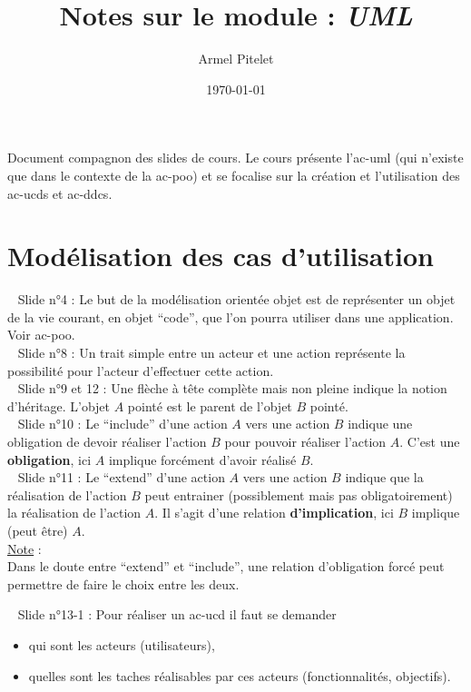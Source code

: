 \documentclass[a4paper,12pt,twoside]{article}
\title{Notes sur le module : \textit{UML}}
\author{Armel Pitelet}
\date{\today}
\newcommand{\note}[1]{\noindent\underline{Note} : \\ \indent #1}
\newcommand{\slide}[2]{\textbullet ~ Slide n°#1 : \indent #2}
\begin{document}
\maketitle
\author{}
\date{}
\tableofcontents%
\newpage

Document compagnon des slides de cours. Le cours présente l'\gls{ac-uml} (qui n'existe que dans le contexte de la \gls{ac-poo}) et se focalise sur la création et l'utilisation des \glspl{ac-ucd} et \glspl{ac-ddc}.   

\section{Modélisation des cas d'utilisation}

\slide{4}{Le but de la modélisation orientée objet est de représenter un objet de la vie courant, en objet ``code'', que l'on pourra utiliser dans une application. Voir \gls{ac-poo}.}\\

\slide{8}{Un trait simple entre un acteur et une action représente la possibilité pour l'acteur d'effectuer cette action.} \\

\slide{9 et 12}{Une flèche à tête complète mais non pleine indique la notion d'héritage. L'objet $A$ pointé est le parent de l'objet $B$ pointé.} \\

\slide{10}{Le ``include'' d'une action $A$ vers une action $B$ indique une obligation de devoir réaliser l'action $B$ pour pouvoir réaliser l'action $A$. C'est une \textbf{obligation}, ici $A$ implique forcément d'avoir réalisé $B$.} \\

\slide{11}{Le ``extend'' d'une action $A$ vers une action $B$ indique que la réalisation de l'action $B$ peut entrainer (possiblement mais pas obligatoirement) la réalisation de l'action $A$. Il s'agit d'une relation \textbf{d'implication}, ici $B$ implique (peut être) $A$.} \\

\note{Dans le doute entre ``extend'' et ``include'', une relation d'obligation forcé peut permettre de faire le choix entre les deux.}

\slide{13-1}{Pour réaliser un \gls{ac-ucd} il faut se demander \begin{itemize}\item qui sont les acteurs (utilisateurs), \item quelles sont les taches réalisables par ces acteurs (fonctionnalités, objectifs).\end{itemize}}$~$
\end{document}
